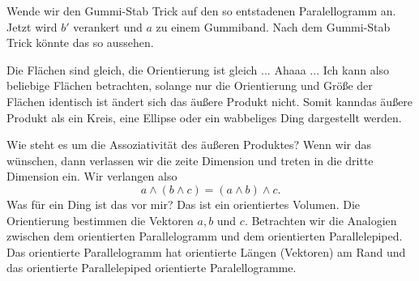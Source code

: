 \documentclass[fleqn]{scrartcl}
\numberwithin{equation}{section}
\begin{document}
Wende wir den Gummi-Stab Trick auf den so entstadenen Paralellogramm an. Jetzt
wird $b'$ verankert und $a$ zu einem Gummiband. Nach dem Gummi-Stab Trick
könnte das so aussehen.
\begin{center}
\begin{minipage}{\linewidth}
\centering
{}
\label{fig:shiftshift}
\end{minipage}
\end{center}

Die Flächen sind gleich, die Orientierung ist gleich ... Ahaaa ... Ich kann
also beliebige Flächen betrachten, solange nur die Orientierung und Größe der
Flächen identisch ist ändert sich das äußere Produkt nicht. Somit kanndas
äußere Produkt als ein Kreis, eine Ellipse oder ein wabbeliges Ding
dargestellt werden.

Wie steht es um die Assoziativität des äußeren Produktes? Wenn wir das
wünschen, dann verlassen wir die zeite Dimension und treten in die dritte
Dimension ein. Wir verlangen also
\[a\wedge(b\wedge c) =(a\wedge b)\wedge c.\]
Was für ein Ding ist das vor mir? Das ist ein orientiertes Volumen. Die
Orientierung bestimmen die Vektoren $a, b$ und $c$. Betrachten wir die
Analogien zwischen dem orientierten Parallelogramm und dem orientierten
Parallelepiped. Das orientierte Parallelogramm hat orientierte Längen
(Vektoren) am Rand und das orientierte Parallelepiped orientierte
Paralellogramme.
\end{document}
